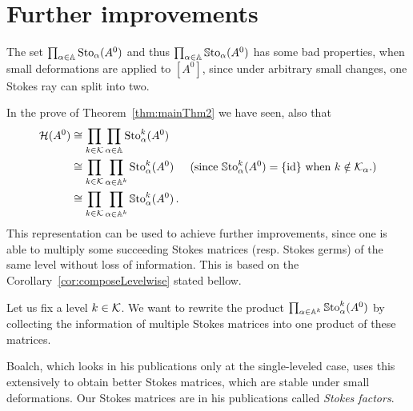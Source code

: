\section{Further improvements}\label{sec:furtherImprovements}
The set $\prod_{\alpha\in\mathbb{A}}\operatorname{Sto}_\alpha(A^0)$ and thus
$\prod_{\alpha\in\mathbb{A}}\operatorname{\mathbb{S}to}_\alpha(A^0)$ has some bad properties, when small
deformations are applied to $[A^0]$, since under arbitrary small changes, one
Stokes ray can split into two.

In the prove of Theorem~\ref{thm:mainThm2} we have seen,  also that
\begin{align*}
  \mathcal{H}(A^0)&\cong\prod_{k\in\mathcal{K}}\prod_{\alpha\in\mathbb{A}}\operatorname{Sto}_\alpha^k(A^0)
  \\&\cong\prod_{k\in\mathcal{K}}\prod_{\alpha\in\mathbb{A}^k}\operatorname{Sto}_\alpha^k(A^0)
  &\text{(since $\operatorname{\mathbb{S}to}_{\alpha}^{k}(A^0)=\{\operatorname{id}\}$ when $k\notin\mathcal{K}_\alpha$.)}
  \\&\cong\prod_{k\in\mathcal{K}}\prod_{\alpha\in\mathbb{A}^k}\operatorname{\mathbb{S}to}_\alpha^k(A^0) \,.
\end{align*}
This representation can be used to achieve further improvements, since one is
able to multiply some succeeding Stokes matrices (resp. Stokes germs) of the
same level without loss of information.
This is based on the Corollary~\ref{cor:composeLevelwise} stated bellow.

Let us fix a level $k\in\mathcal{K}$. We want to rewrite the product
$\prod_{\alpha\in\mathbb{A}^k}\operatorname{\mathbb{S}to}_\alpha^k(A^0)$ by collecting the information of
multiple Stokes matrices into one product of these matrices.

\TODO[move?]
Boalch, which looks in his publications \cite{boalch,thboalch} only at the
single-leveled case, uses this extensively to obtain better Stokes matrices,
which are stable under small deformations. Our Stokes matrices are in his
publications called \emph{Stokes factors}.

